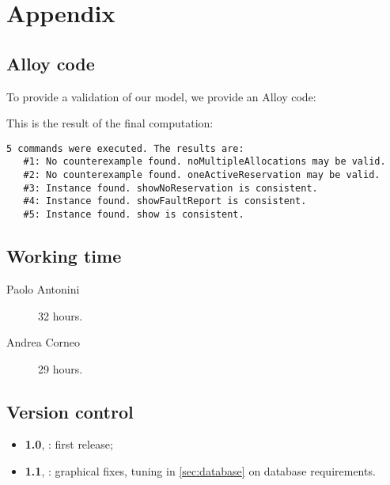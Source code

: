 \chapter{Appendix}\label{chap:appendix}

\section{Alloy code}

To provide a validation of our model, we provide an Alloy code:



This is the result of the final computation:

\begin{Verbatim}[fontsize=\small]
5 commands were executed. The results are:
   #1: No counterexample found. noMultipleAllocations may be valid.
   #2: No counterexample found. oneActiveReservation may be valid.
   #3: Instance found. showNoReservation is consistent.
   #4: Instance found. showFaultReport is consistent.
   #5: Instance found. show is consistent.
\end{Verbatim} 

\section{Working time}

\begin{description}
	\item [Paolo Antonini] 32 hours.
	\item [Andrea Corneo] 29 hours.
\end{description}


\section{Version control}
\begin{itemize}
	\item \textbf{1.0}, : first release;
	\item \textbf{1.1}, : graphical fixes, tuning in \cref{sec:database} on database requirements. %
\end{itemize}